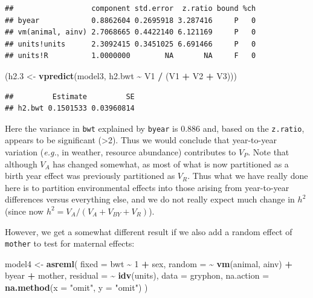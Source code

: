 \documentclass[
  12pt,
]{book}
\newenvironment{Shaded}{\begin{snugshade}}{\end{snugshade}}
\newcommand{\DataTypeTok}[1]{\textcolor[rgb]{0.13,0.29,0.53}{#1}}
\newcommand{\DecValTok}[1]{\textcolor[rgb]{0.00,0.00,0.81}{#1}}
\newcommand{\FloatTok}[1]{\textcolor[rgb]{0.00,0.00,0.81}{#1}}
\newcommand{\KeywordTok}[1]{\textcolor[rgb]{0.13,0.29,0.53}{\textbf{#1}}}
\newcommand{\NormalTok}[1]{#1}
\newcommand{\OperatorTok}[1]{\textcolor[rgb]{0.81,0.36,0.00}{\textbf{#1}}}
\newcommand{\StringTok}[1]{\textcolor[rgb]{0.31,0.60,0.02}{#1}}
\begin{document}
\begin{verbatim}
##                  component std.error  z.ratio bound %ch
## byear            0.8862604 0.2695918 3.287416     P   0
## vm(animal, ainv) 2.7068665 0.4422140 6.121169     P   0
## units!units      2.3092415 0.3451025 6.691466     P   0
## units!R          1.0000000        NA       NA     F   0
\end{verbatim}

\begin{Shaded}
\begin{Highlighting}[]
\NormalTok{(h2}\FloatTok{.3}\NormalTok{ \textless{}{-}}\StringTok{ }\KeywordTok{vpredict}\NormalTok{(model3, h2.bwt }\OperatorTok{\textasciitilde{}}\StringTok{ }\NormalTok{V1 }\OperatorTok{/}\StringTok{ }\NormalTok{(V1 }\OperatorTok{+}\StringTok{ }\NormalTok{V2 }\OperatorTok{+}\StringTok{ }\NormalTok{V3)))}
\end{Highlighting}
\end{Shaded}

\begin{verbatim}
##         Estimate         SE
## h2.bwt 0.1501533 0.03960814
\end{verbatim}

Here the variance in \texttt{bwt} explained by \texttt{byear} is 0.886 and, based on the \texttt{z.ratio}, appears to be significant (\textgreater2). Thus we would conclude that year-to-year variation (\emph{e.g.}, in weather, resource abundance) contributes to \(V_P\). Note that although \(V_A\) has changed somewhat, as most of what is now partitioned as a birth year effect was previously partitioned as \(V_R\). Thus what we have really done here is to partition environmental effects into those arising from year-to-year differences versus everything else, and we do not really expect much change in \(h^2\) (since now \(h^2 = V_A/ (V_A+V_{BY}+V_R)\)).

However, we get a somewhat different result if we also add a random effect of \texttt{mother} to test for maternal effects:

\begin{Shaded}
\begin{Highlighting}[]
\NormalTok{model4 \textless{}{-}}\StringTok{ }\KeywordTok{asreml}\NormalTok{(}
  \DataTypeTok{fixed =}\NormalTok{ bwt }\OperatorTok{\textasciitilde{}}\StringTok{ }\DecValTok{1} \OperatorTok{+}\StringTok{ }\NormalTok{sex,}
  \DataTypeTok{random =} \OperatorTok{\textasciitilde{}}\StringTok{ }\KeywordTok{vm}\NormalTok{(animal, ainv) }\OperatorTok{+}\StringTok{ }\NormalTok{byear }\OperatorTok{+}\StringTok{ }\NormalTok{mother,}
  \DataTypeTok{residual =} \OperatorTok{\textasciitilde{}}\StringTok{ }\KeywordTok{idv}\NormalTok{(units),}
  \DataTypeTok{data =}\NormalTok{ gryphon,}
  \DataTypeTok{na.action =} \KeywordTok{na.method}\NormalTok{(}\DataTypeTok{x =} \StringTok{"omit"}\NormalTok{, }\DataTypeTok{y =} \StringTok{"omit"}\NormalTok{)}
\NormalTok{)}
\end{Highlighting}
\end{Shaded}
\end{document}
